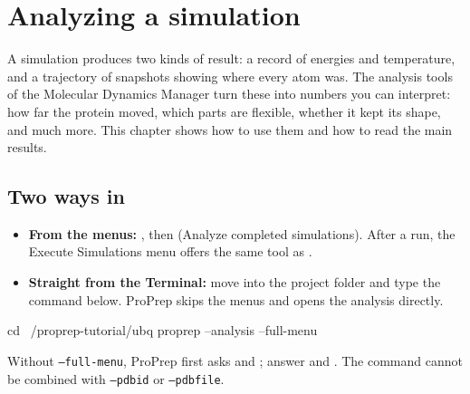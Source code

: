\chapter{Analyzing a simulation}
\label{ch:analysis}

A simulation produces two kinds of result: a record of energies and
temperature, and a trajectory of snapshots showing where every atom was. The
analysis tools of the Molecular Dynamics Manager turn these into numbers you
can interpret: how far the protein moved, which parts are flexible, whether
it kept its shape, and much more. This chapter shows how to use them and how
to read the main results.

\begin{glance}
\end{glance}

\section{Two ways in}

\begin{itemize}
  \item \textbf{From the menus:} , then  (Analyze completed
        simulations). After a run, the Execute Simulations menu offers the
        same tool as .
  \item \textbf{Straight from the Terminal:} move into the project folder and
        type the command below. ProPrep skips the menus and opens the analysis
        directly.
\end{itemize}

\begin{terminal}
cd ~/proprep-tutorial/ubq
proprep --analysis --full-menu
\end{terminal}

Without \texttt{--full-menu}, ProPrep first asks  and ; answer 
and . The command cannot be combined with \texttt{--pdbid} or
\texttt{--pdbfile}.


